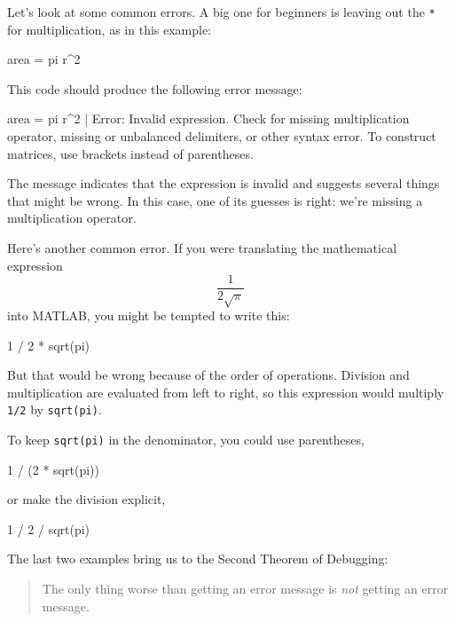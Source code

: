 \documentclass[../../book.tex]{subfiles}
\begin{document}
Let's look at some common errors. A big one for beginners is leaving out the \lstinline{*}
for multiplication, as in this example:

\begin{code}
area = pi r^2
\end{code}

This code should produce the following error message:

\begin{stdout}
 area = pi r^2
           |
Error: Invalid expression. Check for missing multiplication
operator, missing or unbalanced delimiters, or other syntax
error. To construct matrices, use brackets instead of parentheses.
\end{stdout}
%
%

The message indicates that the expression is invalid and suggests several things that might be wrong.
In this case, one of its guesses is right: we're missing a multiplication operator.



Here's another common error.
If you were translating the mathematical expression
%
\[ \frac{1}{2 \sqrt \pi} \]
%
into MATLAB, you might be tempted to write this:

\begin{code}
1 / 2 * sqrt(pi)
\end{code}

But that would be wrong because of the order of operations.  Division and multiplication are evaluated from left to right, so this expression would multiply \lstinline{1/2} by \lstinline{sqrt(pi)}.


To keep \lstinline{sqrt(pi)} in the denominator, you could use parentheses,

\begin{code}
1 / (2 * sqrt(pi))
\end{code}
or make the division explicit,

\begin{code}
1 / 2 / sqrt(pi)
\end{code}


The last two examples bring us to the Second Theorem of Debugging:

\begin{quote}
The only thing worse than getting an error message is \emph{not} getting an error message.
\end{quote}
\end{document}
